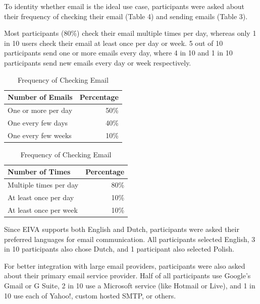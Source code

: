\documentclass{article}
\begin{document}
To identity whether email is the ideal use case, participants were asked about their frequency of checking their email (Table 4) and sending emails (Table 3).

Most participants (80\%) check their email multiple times per day, whereas only 1 in 10 users check their email at least once per day or week. 5 out of 10 participants send one or more emails every day, where 4 in 10 and 1 in 10 participants send new emails every day or week respectively.

\begin{table}[!htb]
	\begin{minipage}{.5\linewidth}
		\caption{Frequency of Emails Sent}
		\centering
		\begin{tabular}{lr}
			\hline
			\textbf{Number of Emails} & \textbf{Percentage} \\
			\hline
			One or more per day       & 50\%                \\
			One every few days        & 40\%                \\
			One every few weeks       & 10\%                \\
			\hline
		\end{tabular}
	\end{minipage}%
	\hspace{.1cm}
	\begin{minipage}{.5\linewidth}
		\centering
		\caption{Frequency of Checking Email}
		\begin{tabular}{lr}
			\hline
			\textbf{Number of Times} & \textbf{Percentage} \\
			\hline
			Multiple times per day   & 80\%                \\
			At least once per day    & 10\%                \\
			At least once per week   & 10\%                \\
			\hline
		\end{tabular}
	\end{minipage} 
\end{table}

Since EIVA supports both English and Dutch, participants were asked their preferred languages for email communication. All participants selected English, 3 in 10 participants also chose Dutch, and 1 participant also selected Polish.

For better integration with large email providers, participants were also asked about their primary email service provider. Half of all participants use Google's Gmail or G Suite, 2 in 10 use a Microsoft service (like Hotmail or Live), and 1 in 10 use each of Yahoo!, custom hosted SMTP, or others.
\end{document}
